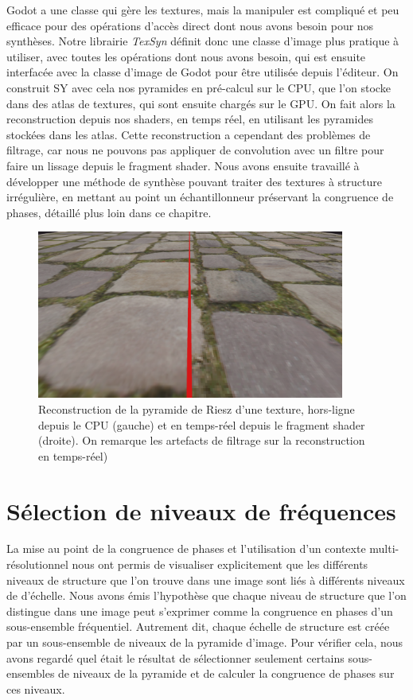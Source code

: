 Godot a une classe qui gère les textures, mais la manipuler est compliqué et peu efficace pour des opérations d'accès direct dont nous avons besoin pour nos synthèses. Notre librairie \textit{TexSyn} définit donc une classe d'image plus pratique à utiliser, avec toutes les opérations dont nous avons besoin, qui est ensuite interfacée avec la classe d'image de Godot pour être utilisée depuis l'éditeur. On construit SY avec cela nos pyramides en pré-calcul sur le CPU, que l'on stocke dans des atlas de textures, qui sont ensuite chargés sur le GPU. On fait alors la reconstruction depuis nos shaders, en temps réel, en utilisant les pyramides stockées dans les atlas. Cette reconstruction a cependant des problèmes de filtrage, car nous ne pouvons pas appliquer de convolution avec un filtre pour faire un lissage depuis le fragment shader. Nous avons ensuite travaillé à développer une méthode de synthèse pouvant traiter des textures à structure irrégulière, en mettant au point un échantillonneur préservant la congruence de phases, détaillé plus loin dans ce chapitre.

\begin{figure}
    \centering
    \includegraphics[width=0.9\textwidth]{contenu/resources/images/reconstruction_cpu_vs_gpu}
    \caption[Reconstruction de texture dans \textit{TexSyn}]{Reconstruction de la pyramide de Riesz d'une texture, hors-ligne depuis le CPU (gauche) et en temps-réel depuis le fragment shader (droite). On remarque les artefacts de filtrage sur la reconstruction en temps-réel)}
    \label{fig:texsyn-reconstruction}
\end{figure}


\section{Sélection de niveaux de fréquences}

La mise au point de la congruence de phases et l'utilisation d'un contexte multi-résolutionnel nous ont permis de visualiser explicitement que les différents niveaux de structure que l'on trouve dans une image sont liés à différents niveaux de d'échelle. Nous avons émis l'hypothèse que chaque niveau de structure que l'on distingue dans une image peut s'exprimer comme la congruence en phases d'un sous-ensemble fréquentiel. Autrement dit, chaque échelle de structure est créée par un sous-ensemble de niveaux de la pyramide d'image. Pour vérifier cela, nous avons regardé quel était le résultat de sélectionner seulement certains sous-ensembles de niveaux de la pyramide et de calculer la congruence de phases sur ces niveaux.

